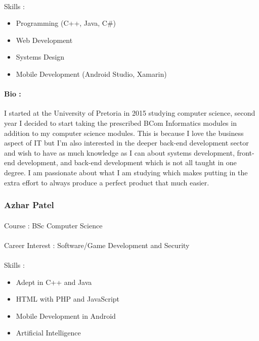 \documentclass[11pt]{article}
\begin{document}
\paragraph{}Skills : 
\begin{itemize}
\item Programming (C++, Java, C\#)
\item Web Development
\item Systems Design
\item Mobile Development (Android Studio, Xamarin)
\end{itemize}
\paragraph{Bio :}I started at the University of Pretoria in 2015 studying computer science, second year I  decided to start taking the prescribed BCom Informatics modules in addition to my computer science modules. This is because I love the business aspect of IT but I'm also interested in the deeper back-end development sector and wish to have as much knowledge as I can about systems development, front-end development, and back-end development which is not all taught in one degree. I am passionate about what I am studying which makes putting in the extra effort to always produce a perfect product that much easier. 

\subsubsection{Azhar Patel}
\paragraph{}Course : BSc Computer Science
\paragraph{}Career Interest : Software/Game Development and Security
\paragraph{}Skills : 
\begin{itemize}
\item Adept in C++ and Java
\item HTML with PHP and JavaScript
\item Mobile Development in Android
\item Artificial Intelligence 
\end{itemize}
\end{document}
